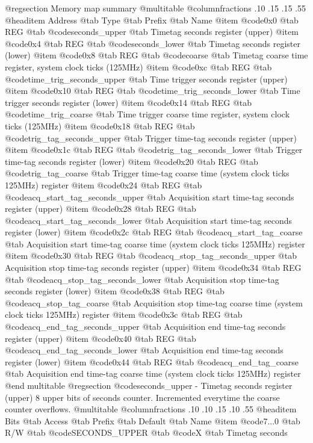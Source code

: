 @regsection Memory map summary
@multitable  @columnfractions .10 .15 .15 .55
@headitem Address @tab Type @tab Prefix @tab Name
@item @code{0x0} @tab
REG @tab
@code{seconds_upper} @tab
Timetag seconds register (upper)
@item @code{0x4} @tab
REG @tab
@code{seconds_lower} @tab
Timetag seconds register (lower)
@item @code{0x8} @tab
REG @tab
@code{coarse} @tab
Timetag coarse time register, system clock ticks (125MHz)
@item @code{0xc} @tab
REG @tab
@code{time_trig_seconds_upper} @tab
Time trigger seconds register (upper)
@item @code{0x10} @tab
REG @tab
@code{time_trig_seconds_lower} @tab
Time trigger seconds register (lower)
@item @code{0x14} @tab
REG @tab
@code{time_trig_coarse} @tab
Time trigger coarse time register, system clock ticks (125MHz)
@item @code{0x18} @tab
REG @tab
@code{trig_tag_seconds_upper} @tab
Trigger time-tag seconds register (upper)
@item @code{0x1c} @tab
REG @tab
@code{trig_tag_seconds_lower} @tab
Trigger time-tag seconds register (lower)
@item @code{0x20} @tab
REG @tab
@code{trig_tag_coarse} @tab
Trigger time-tag coarse time (system clock ticks 125MHz) register
@item @code{0x24} @tab
REG @tab
@code{acq_start_tag_seconds_upper} @tab
Acquisition start time-tag seconds register (upper)
@item @code{0x28} @tab
REG @tab
@code{acq_start_tag_seconds_lower} @tab
Acquisition start time-tag seconds register (lower)
@item @code{0x2c} @tab
REG @tab
@code{acq_start_tag_coarse} @tab
Acquisition start time-tag coarse time (system clock ticks 125MHz) register
@item @code{0x30} @tab
REG @tab
@code{acq_stop_tag_seconds_upper} @tab
Acquisition stop time-tag seconds register (upper)
@item @code{0x34} @tab
REG @tab
@code{acq_stop_tag_seconds_lower} @tab
Acquisition stop time-tag seconds register (lower)
@item @code{0x38} @tab
REG @tab
@code{acq_stop_tag_coarse} @tab
Acquisition stop time-tag coarse time (system clock ticks 125MHz) register
@item @code{0x3c} @tab
REG @tab
@code{acq_end_tag_seconds_upper} @tab
Acquisition end time-tag seconds register (upper)
@item @code{0x40} @tab
REG @tab
@code{acq_end_tag_seconds_lower} @tab
Acquisition end time-tag seconds register (lower)
@item @code{0x44} @tab
REG @tab
@code{acq_end_tag_coarse} @tab
Acquisition end time-tag coarse time (system clock ticks 125MHz) register
@end multitable 
@regsection @code{seconds_upper} - Timetag seconds register (upper)
8 upper bits of seconds counter. Incremented everytime the coarse counter overflows.
@multitable @columnfractions .10 .10 .15 .10 .55
@headitem Bits @tab Access @tab Prefix @tab Default @tab Name
@item @code{7...0}
@tab R/W @tab
@code{SECONDS_UPPER}
@tab @code{X} @tab 
Timetag seconds
